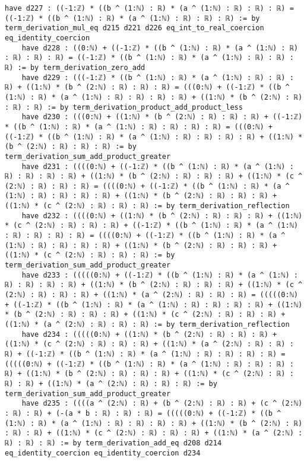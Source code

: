\documentclass{article}
\begin{document}
\begin{tcolorbox}[colback=white!10, width=\linewidth]
\begin{lstlisting}[language=Lean4]
    have d227 : ((-1:ℤ) * ((b ^ (1:ℕ) : ℝ) * (a ^ (1:ℕ) : ℝ) : ℝ) : ℝ) = ((-1:ℤ) * ((b ^ (1:ℕ) : ℝ) * (a ^ (1:ℕ) : ℝ) : ℝ) : ℝ) := by term_derivation_mul_eq d215 d221 d226 eq_int_to_real_coercion eq_identity_coercion
    have d228 : ((0:ℕ) + ((-1:ℤ) * ((b ^ (1:ℕ) : ℝ) * (a ^ (1:ℕ) : ℝ) : ℝ) : ℝ) : ℝ) = ((-1:ℤ) * ((b ^ (1:ℕ) : ℝ) * (a ^ (1:ℕ) : ℝ) : ℝ) : ℝ) := by term_derivation_zero_add
    have d229 : (((-1:ℤ) * ((b ^ (1:ℕ) : ℝ) * (a ^ (1:ℕ) : ℝ) : ℝ) : ℝ) + ((1:ℕ) * (b ^ (2:ℕ) : ℝ) : ℝ) : ℝ) = (((0:ℕ) + ((-1:ℤ) * ((b ^ (1:ℕ) : ℝ) * (a ^ (1:ℕ) : ℝ) : ℝ) : ℝ) : ℝ) + ((1:ℕ) * (b ^ (2:ℕ) : ℝ) : ℝ) : ℝ) := by term_derivation_product_add_product_less
    have d230 : (((0:ℕ) + ((1:ℕ) * (b ^ (2:ℕ) : ℝ) : ℝ) : ℝ) + ((-1:ℤ) * ((b ^ (1:ℕ) : ℝ) * (a ^ (1:ℕ) : ℝ) : ℝ) : ℝ) : ℝ) = (((0:ℕ) + ((-1:ℤ) * ((b ^ (1:ℕ) : ℝ) * (a ^ (1:ℕ) : ℝ) : ℝ) : ℝ) : ℝ) + ((1:ℕ) * (b ^ (2:ℕ) : ℝ) : ℝ) : ℝ) := by term_derivation_sum_add_product_greater
    have d231 : ((((0:ℕ) + ((-1:ℤ) * ((b ^ (1:ℕ) : ℝ) * (a ^ (1:ℕ) : ℝ) : ℝ) : ℝ) : ℝ) + ((1:ℕ) * (b ^ (2:ℕ) : ℝ) : ℝ) : ℝ) + ((1:ℕ) * (c ^ (2:ℕ) : ℝ) : ℝ) : ℝ) = ((((0:ℕ) + ((-1:ℤ) * ((b ^ (1:ℕ) : ℝ) * (a ^ (1:ℕ) : ℝ) : ℝ) : ℝ) : ℝ) + ((1:ℕ) * (b ^ (2:ℕ) : ℝ) : ℝ) : ℝ) + ((1:ℕ) * (c ^ (2:ℕ) : ℝ) : ℝ) : ℝ) := by term_derivation_reflection
    have d232 : ((((0:ℕ) + ((1:ℕ) * (b ^ (2:ℕ) : ℝ) : ℝ) : ℝ) + ((1:ℕ) * (c ^ (2:ℕ) : ℝ) : ℝ) : ℝ) + ((-1:ℤ) * ((b ^ (1:ℕ) : ℝ) * (a ^ (1:ℕ) : ℝ) : ℝ) : ℝ) : ℝ) = ((((0:ℕ) + ((-1:ℤ) * ((b ^ (1:ℕ) : ℝ) * (a ^ (1:ℕ) : ℝ) : ℝ) : ℝ) : ℝ) + ((1:ℕ) * (b ^ (2:ℕ) : ℝ) : ℝ) : ℝ) + ((1:ℕ) * (c ^ (2:ℕ) : ℝ) : ℝ) : ℝ) := by term_derivation_sum_add_product_greater
    have d233 : (((((0:ℕ) + ((-1:ℤ) * ((b ^ (1:ℕ) : ℝ) * (a ^ (1:ℕ) : ℝ) : ℝ) : ℝ) : ℝ) + ((1:ℕ) * (b ^ (2:ℕ) : ℝ) : ℝ) : ℝ) + ((1:ℕ) * (c ^ (2:ℕ) : ℝ) : ℝ) : ℝ) + ((1:ℕ) * (a ^ (2:ℕ) : ℝ) : ℝ) : ℝ) = (((((0:ℕ) + ((-1:ℤ) * ((b ^ (1:ℕ) : ℝ) * (a ^ (1:ℕ) : ℝ) : ℝ) : ℝ) : ℝ) + ((1:ℕ) * (b ^ (2:ℕ) : ℝ) : ℝ) : ℝ) + ((1:ℕ) * (c ^ (2:ℕ) : ℝ) : ℝ) : ℝ) + ((1:ℕ) * (a ^ (2:ℕ) : ℝ) : ℝ) : ℝ) := by term_derivation_reflection
    have d234 : (((((0:ℕ) + ((1:ℕ) * (b ^ (2:ℕ) : ℝ) : ℝ) : ℝ) + ((1:ℕ) * (c ^ (2:ℕ) : ℝ) : ℝ) : ℝ) + ((1:ℕ) * (a ^ (2:ℕ) : ℝ) : ℝ) : ℝ) + ((-1:ℤ) * ((b ^ (1:ℕ) : ℝ) * (a ^ (1:ℕ) : ℝ) : ℝ) : ℝ) : ℝ) = (((((0:ℕ) + ((-1:ℤ) * ((b ^ (1:ℕ) : ℝ) * (a ^ (1:ℕ) : ℝ) : ℝ) : ℝ) : ℝ) + ((1:ℕ) * (b ^ (2:ℕ) : ℝ) : ℝ) : ℝ) + ((1:ℕ) * (c ^ (2:ℕ) : ℝ) : ℝ) : ℝ) + ((1:ℕ) * (a ^ (2:ℕ) : ℝ) : ℝ) : ℝ) := by term_derivation_sum_add_product_greater
    have d235 : ((((a ^ (2:ℕ) : ℝ) + (b ^ (2:ℕ) : ℝ) : ℝ) + (c ^ (2:ℕ) : ℝ) : ℝ) + (-(a * b : ℝ) : ℝ) : ℝ) = (((((0:ℕ) + ((-1:ℤ) * ((b ^ (1:ℕ) : ℝ) * (a ^ (1:ℕ) : ℝ) : ℝ) : ℝ) : ℝ) + ((1:ℕ) * (b ^ (2:ℕ) : ℝ) : ℝ) : ℝ) + ((1:ℕ) * (c ^ (2:ℕ) : ℝ) : ℝ) : ℝ) + ((1:ℕ) * (a ^ (2:ℕ) : ℝ) : ℝ) : ℝ) := by term_derivation_add_eq d208 d214 eq_identity_coercion eq_identity_coercion d234

\end{lstlisting}
\end{tcolorbox}
\end{document}
